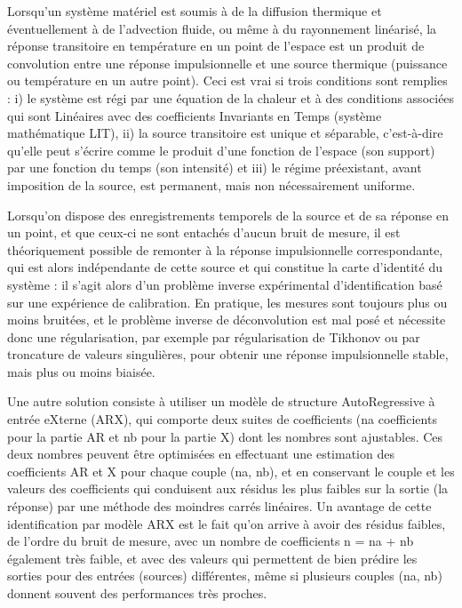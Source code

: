 {\normalsize
Lorsqu'un système matériel est soumis à de la diffusion thermique et éventuellement à de l'advection fluide, ou même à du rayonnement linéarisé, la réponse transitoire en température en un point de l'espace est un produit de convolution entre une réponse impulsionnelle et une source thermique (puissance ou température en un autre point). Ceci est vrai si trois conditions sont remplies : i) le système est régi par une équation de la chaleur et à des conditions associées qui sont Linéaires avec des coefficients Invariants en Temps (système mathématique LIT), ii) la source transitoire est unique et séparable, c'est-à-dire qu'elle peut s'écrire comme le produit d'une fonction de l'espace (son support) par une fonction du temps (son intensité) et iii) le régime préexistant, avant imposition de la source, est permanent, mais non nécessairement uniforme.



Lorsqu'on dispose des enregistrements temporels de la source et de sa réponse en un point, et que ceux-ci ne sont entachés d'aucun bruit de mesure, il est théoriquement possible de remonter à la réponse impulsionnelle correspondante, qui est alors indépendante de cette source et qui constitue la carte d'identité du système : il s'agit alors d'un problème inverse expérimental d'identification basé sur une expérience de calibration. En pratique, les mesures sont toujours plus ou moins  bruitées, et le problème inverse de déconvolution est mal posé et nécessite donc une régularisation, par exemple par régularisation de Tikhonov ou par troncature de valeurs singulières, pour obtenir une réponse impulsionnelle stable, mais plus ou moins biaisée. 



Une autre solution consiste à utiliser un modèle de structure AutoRegressive à entrée eXterne (ARX), qui comporte deux suites de coefficients (na coefficients pour la partie AR et nb pour la partie X) dont les nombres sont ajustables. Ces deux nombres peuvent être optimisées en effectuant une estimation des coefficients AR et X pour chaque couple (na, nb), et en conservant le couple et les valeurs des coefficients qui conduisent aux résidus les plus faibles sur la sortie (la réponse) par une méthode des moindres carrés linéaires. Un avantage de cette identification par modèle ARX est le fait qu'on arrive à avoir des résidus faibles, de l'ordre du bruit de mesure, avec un nombre de coefficients n = na + nb également très faible, et avec des valeurs qui permettent de bien prédire les sorties pour des entrées (sources) différentes, même si plusieurs couples (na, nb) donnent souvent des performances très proches. 



}
